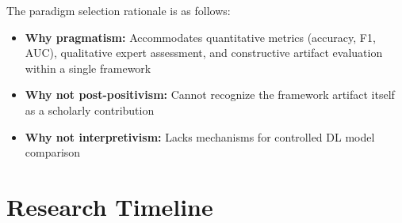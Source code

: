 The paradigm selection rationale is as follows:
\begin{itemize}
    \item \textbf{Why pragmatism:} Accommodates quantitative metrics (accuracy, F1, AUC), qualitative expert assessment, and constructive artifact evaluation within a single framework
    \item \textbf{Why not post-positivism:} Cannot recognize the framework artifact itself as a scholarly contribution
    \item \textbf{Why not interpretivism:} Lacks mechanisms for controlled DL model comparison
\end{itemize}


\section{Research Timeline}
\label{sec:appx_timeline}

